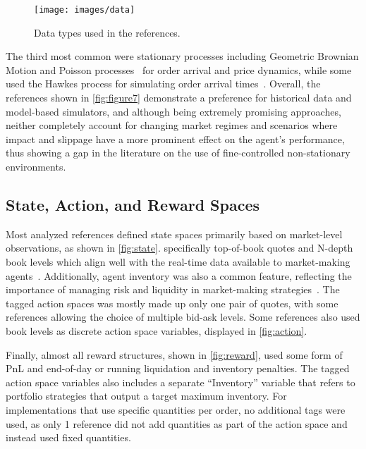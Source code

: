 \begin{figure}
    \centering
    \texttt{[image: images/data]}
    \caption{Data types used in the references.}
    \label{fig:figure7}
\end{figure}

The third most common were stationary processes including Geometric Brownian Motion and Poisson processes~\cite{Gasperov2021, Sun2022} for
order arrival and price dynamics, while some used the Hawkes process for simulating order arrival times~\cite{Jerome2022, Selser2021}.
Overall, the references shown in \autoref{fig:figure7} demonstrate a preference for historical data and model-based simulators,
and although being extremely promising approaches, neither completely account for changing market regimes and scenarios where impact and
slippage have a more prominent effect on the agent's performance, thus showing
a gap in the literature on the use of fine-controlled non-stationary environments.

\subsection{State, Action, and Reward Spaces}
\label{subsec:spaces}

Most analyzed references defined state spaces primarily based on market-level observations, as shown in \autoref{fig:state}.
specifically top-of-book quotes and N-depth book levels which align well with the real-time data available to market-making agents~\cite{He2023, Bakshaev2020}.
Additionally, agent inventory was also a common feature, reflecting the importance of managing risk and liquidity in market-making strategies~\cite{Patel2018, Ganesh2019}.
The tagged action spaces was mostly made up only one pair of quotes, with some references allowing the choice of multiple bid-ask levels.
Some references also used book levels as discrete action space variables, displayed in \autoref{fig:action}.

Finally, almost all reward structures, shown in \autoref{fig:reward},
used some form of PnL and end-of-day or running liquidation and inventory penalties.
The tagged action space variables also includes a separate ``Inventory'' variable that refers to portfolio strategies that output a target maximum inventory.
For implementations that use specific quantities per order, no additional tags were used,
as only 1 reference did not add quantities as part of the action space and instead used fixed quantities.

